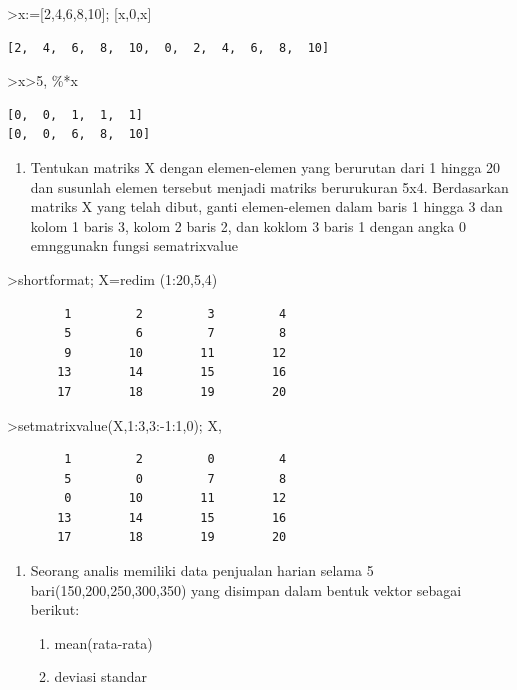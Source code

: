 \documentclass[
]{book}
\providecommand{\tightlist}{%
  \setlength{\itemsep}{0pt}\setlength{\parskip}{0pt}}
\begin{document}
\textgreater x:={[}2,4,6,8,10{]}; {[}x,0,x{]}

\begin{verbatim}
[2,  4,  6,  8,  10,  0,  2,  4,  6,  8,  10]
\end{verbatim}

\textgreater x\textgreater5, \%*x

\begin{verbatim}
[0,  0,  1,  1,  1]
[0,  0,  6,  8,  10]
\end{verbatim}

\begin{enumerate}
\def\labelenumi{\arabic{enumi}.}
\setcounter{enumi}{1}
\tightlist
\item
  Tentukan matriks X dengan elemen-elemen yang berurutan dari 1 hingga 20 dan susunlah elemen tersebut menjadi matriks berurukuran 5x4. Berdasarkan matriks X yang telah dibut, ganti elemen-elemen dalam baris 1 hingga 3 dan kolom 1 baris 3, kolom 2 baris 2, dan koklom 3 baris 1 dengan angka 0 emnggunakn fungsi sematrixvalue
\end{enumerate}

\textgreater shortformat; X=redim (1:20,5,4)

\begin{verbatim}
        1         2         3         4 
        5         6         7         8 
        9        10        11        12 
       13        14        15        16 
       17        18        19        20 
\end{verbatim}

\textgreater setmatrixvalue(X,1:3,3:-1:1,0); X,

\begin{verbatim}
        1         2         0         4 
        5         0         7         8 
        0        10        11        12 
       13        14        15        16 
       17        18        19        20 
\end{verbatim}

\begin{enumerate}
\def\labelenumi{\arabic{enumi}.}
\setcounter{enumi}{2}
\item
  Seorang analis memiliki data penjualan harian selama 5 bari(150,200,250,300,350) yang disimpan dalam bentuk vektor sebagai berikut:

  \begin{enumerate}
  \def\labelenumii{\alph{enumii}.}
  \item
    mean(rata-rata)
  \item
    deviasi standar
  \end{enumerate}
\end{enumerate}
\end{document}
